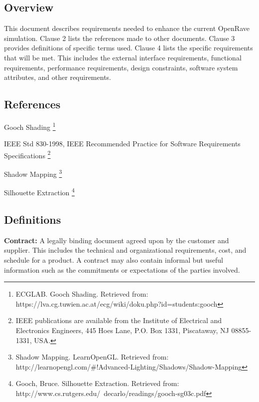 \newpage
\begin{flushleft}
\subsection{Overview}
\vspace{3mm}
This document describes requirements needed to enhance the current OpenRave simulation. 
Clause 2 lists the references made to other documents. 
Clause 3 provides definitions of specific terms used.
Clause 4 lists the specific requirements that will be met.
This includes the external interface requirements, functional requirements, performance requirements, design constraints, software system attributes, and other requirements.

\subsection{References}
\vspace{3mm}

Gooch Shading \footnote{\label{note1}ECGLAB. Gooch Shading. Retrieved from: https://lva.cg.tuwien.ac.at/ecg/wiki/doku.php?id=students:gooch}
\vspace{3mm}

IEEE Std 830-1998, IEEE Recommended Practice for Software Requirements Specifications \footnote{\label{note2}IEEE publications are available from the Institute of Electrical and Electronics Engineers, 445 Hoes Lane, P.O. Box 1331, Piscataway, NJ 08855-1331, USA.}
\vspace{3mm}

Shadow Mapping \footnote{\label{note3} Shadow Mapping. LearnOpenGL. Retrieved from: http://learnopengl.com/\#!Advanced-Lighting/Shadows/Shadow-Mapping}
\vspace{3mm}

Silhouette Extraction \footnote{\label{note4}Gooch, Bruce. Silhouette Extraction. Retrieved from: http://www.cs.rutgers.edu/~decarlo/readings/gooch-sg03c.pdf}

\subsection{Definitions}

\vspace{3mm}
\textbf{Contract:}
A legally binding document agreed upon by the customer and supplier. This includes the technical and organizational requirements, cost, and schedule for a product. A contract may also contain informal but useful information such as the commitments or expectations of the parties involved.


\end{flushleft}
